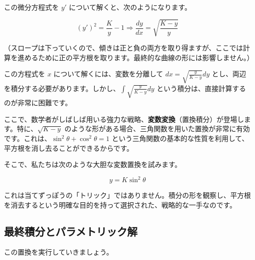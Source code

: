 \documentclass[12pt,a4paper]{ltjsarticle}
\begin{document}
この微分方程式を $y'$ について解くと、次のようになります。

\begin{equation}
(y')^2 = \frac{K}{y} - 1 \Rightarrow \frac{dy}{dx} = \sqrt{\frac{K-y}{y}}
\end{equation}

（スロープは下っていくので、傾きは正と負の両方を取り得ますが、ここでは計算を進めるために正の平方根を取ります。最終的な曲線の形には影響しません。）

この方程式を $x$ について解くには、変数を分離して $dx = \sqrt{\frac{y}{K-y}} dy$ とし、両辺を積分する必要があります。しかし、$\int \sqrt{\frac{y}{K-y}} dy$ という積分は、直接計算するのが非常に困難です。

ここで、数学者がしばしば用いる強力な戦略、\textbf{変数変換}（置換積分）が登場します。特に、$\sqrt{K-y}$ のような形がある場合、三角関数を用いた置換が非常に有効です。これは、$\sin^2\theta + \cos^2\theta = 1$ という三角関数の基本的な性質を利用して、平方根を消し去ることができるからです。

そこで、私たちは次のような大胆な変数置換を試みます。

\begin{equation}
y = K\sin^2\theta
\end{equation}

これは当てずっぽうの「トリック」ではありません。積分の形を観察し、平方根を消去するという明確な目的を持って選択された、戦略的な一手なのです。

\subsection{最終積分とパラメトリック解}

この置換を実行していきましょう。
\end{document}
